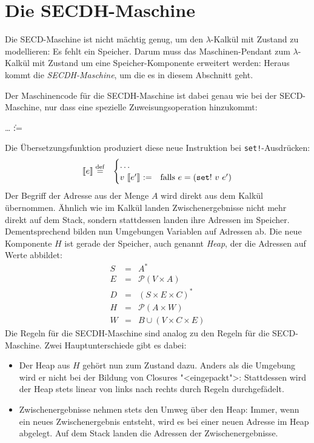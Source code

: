 \section{Die SECDH-Maschine}

Die SECD-Maschine ist nicht mächtig genug, um den $\lambda$-Kalkül mit
Zustand zu modellieren: Es fehlt ein Speicher.  Darum muss das
Maschinen-Pendant zum $\lambda$-Kalkül mit Zustand um eine
Speicher-Komponente erweitert werden: Heraus kommt die
\textit{SECDH-Maschine}, um die es in diesem Abschnitt geht.

Der Maschinencode für die SECDH-Maschine ist dabei genau wie bei der
SECD-Maschine, nur dass eine spezielle Zuweisungsoperation hinzukommt:
%
\begin{grammar}
   \: \ldots
  \> \| :=
\end{grammar}
%
Die Übersetzungsfunktion produziert diese neue Instruktion bei
\texttt{set!}-Ausdrücken:
%
\begin{eqnarray*}
  \llbracket e \rrbracket &\stackrel{\rm def}{=}&
  \begin{cases}
    \ldots\\
    v~\llbracket e'\rrbracket~\mathtt{:=}
    & \textrm{falls $e = (\mathtt{set!}~v~e')$}
  \end{cases}
\end{eqnarray*}  
%
Der Begriff der Adresse aus der Menge $A$ wird direkt aus dem Kalkül
übernommen.  Ähnlich wie im Kalkül landen Zwischenergebnisse nicht
mehr direkt auf dem Stack, sondern stattdessen landen ihre Adressen im
Speicher.  Dementsprechend bilden nun Umgebungen Variablen auf
Adressen ab.  Die neue Komponente $H$ ist gerade der Speicher, auch
genannt \textit{Heap}, der die Adressen auf Werte
abbildet:
%
\begin{eqnarray*}
  S &=& A^{\ast}\\
  E &=& \mathcal{P}(V\times A)\\
  D &=& (S\times E\times C)^{\ast}\\
  H &=& \mathcal{P}(A\times W)\\
  W &=& B \cup (V\times C\times E)
\end{eqnarray*}
%
Die Regeln für die SECDH-Maschine sind analog zu den Regeln für die
SECD-Maschine.  Zwei Hauptunterschiede gibt es dabei:
%
\begin{itemize}
\item Der Heap aus $H$ gehört nun zum Zustand dazu.  Anders als die
  Umgebung wird er nicht bei der Bildung von Closures "<eingepackt">:
  Stattdessen wird der Heap stets linear von links nach rechts durch
  Regeln durchgefädelt.
\item Zwischenergebnisse nehmen stets den Umweg über den Heap: Immer,
  wenn ein neues Zwischenergebnis entsteht, wird es bei einer neuen
  Adresse im Heap abgelegt. Auf dem Stack landen die
  Adressen der Zwischenergebnisse.
\end{itemize}

